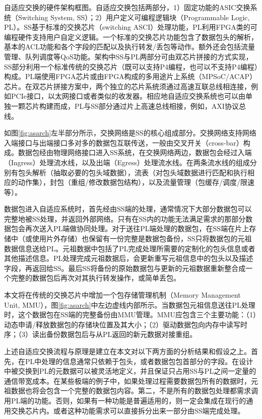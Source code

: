 自适应交换的硬件架构框图。自适应交换包括两部分，1）固定功能的ASIC交换系统（Switching System, SS）；2）用户定义可编程逻辑块（Programmable Logic, PL）。SS基于标准的交换芯片（switching ASCI）处理功能，PL利用FPGA类的可编程硬件支持用户自定义逻辑。一个标准的交换芯片功能包含了数据包头的解析，基本的ACL功能和各个字段的匹配以及执行转发/丢包等动作。额外还会包括流量管理、队列调度等QoS功能。架构中SS与PL两部分可由双芯片拼接的方式实现，SS部分利用一个标准传统的交换芯片（既可以支持P4编程，也可以不支持P4编程）构成。PL端使用FPGA芯片或由FPGA构成的多用途片上系统（MPSoC/ACAP）芯片。在双芯片拼接方案中，两个独立的芯片系统须通过高速互联总线相连接，例如PCIe接口，以太网接口或者类似的收发器。相应地自适应交换系统也可以由单独一颗芯片构建而成，PL与SS部分通过片上高速总线相接，例如，AXI协议总线。

如图\ref{fig:asarch}左半部分所示，交换网络是SS的核心组成部分。交换网络支持网络入端接口与出端接口多对多的数据包互联传送，一般由交叉开关（cross-bar）构成。数据包经由物理网络接口进入SS系统，在交换网络两边，数据包会经过入端（Ingress）处理流水线，以及出端（Egress）处理流水线。在两条流水线的组成分别有包头解析（抽取必要的包头域数据），流表（对包头域数据进行匹配和执行相应的动作集），封包（重组/修改数据包结构），以及流量管理（包缓存/调度/限速等）。

数据包进入自适应系统时，首先经由SS端的处理，通常情况下大部分数据包可以完整地被SS处理，并返回外部网络。只有在SS内的功能无法满足需求的那部分数据包会再次送入PL端做协同处理。对于送往PL端处理的数据包，在SS端在片上存储中（或使用片外存储）也保留有一份完整是数据包备份，SS只将数据包的元祖数据信息送给PL。元祖数据中包括了PL完成处理所需要的定制化的包头信息或者其他描述信息。PL处理完成元祖数据后，会更新重写元祖信息中的包头以及描述字段，再返回给SS。最后SS将备份的原始数据包与更新的元祖数据重新整合成一个完整的数据包后再次对其执行转发操作，或简单丢包。

本文将在传统的交换芯片中增加一个包存储管理机制（Memory Management Unit, MMU），图\ref{fig:asarch}中左边虚线内部所示。当数据包元祖信息送往PL处理时，这个数据包在SS端的完整备份由MMU管理。MMU应包含三个主要功能：（1）动态申请/释放数据包的存储块位置及其大小；（2）驱动数据包向内存中读写时序；（3）读出备份数据包后与从PL返回的新元数据对接重组。

上述自适应交换流程与原理是建立在本文对以下两方面的分析结果和假设之上。首先，在PL中处理的信息通常只依赖于包头，或者数据包包首部分的字段。在设计中被交换到PL的元数据可以被灵活地定义，并且保证只占用SS与PL之间一定量的通信带宽成本。在某些极端的例子中，如果处理过程需要数据包所有的数据时，元祖数据也将会包含一个完整的数据包内容。第二，不是所有的数据包处理都需求调用PL端的功能。否则，如果有一种功能是普遍适用的，则一定会集成在现行的通用交换芯片内。或者这种功能需求可以直接拆分出来一部分由SS端完成处理。

